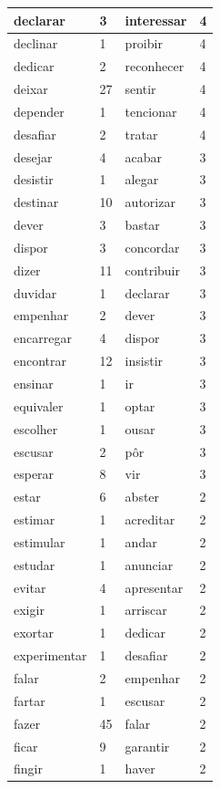 \documentclass[output=paper,colorlinks,citecolor=brown]{langscibook}
\begin{document}
\begin{longtable}{ p{3cm} | p{1cm} | p{3cm} | p{1cm} }
			declarar & 3 & interessar & 4\\\hline
			declinar & 1 & proibir & 4\\\hline
			dedicar & 2 & reconhecer & 4\\\hline
			deixar & 27 & sentir & 4\\\hline
			depender & 1 & tencionar & 4\\\hline
			desafiar & 2 & tratar & 4\\\hline
			desejar & 4 & acabar & 3\\\hline
			desistir & 1 & alegar & 3\\\hline
			destinar & 10 & autorizar & 3\\\hline
			dever & 3 & bastar & 3\\\hline
			dispor & 3 & concordar & 3\\\hline
			dizer & 11 & contribuir & 3\\\hline
			duvidar & 1 & declarar & 3\\\hline
			empenhar & 2 & dever & 3\\\hline
			encarregar & 4 & dispor & 3\\\hline
			encontrar & 12 & insistir & 3\\\hline
			ensinar & 1 & ir & 3\\\hline
			equivaler & 1 & optar & 3\\\hline
			escolher & 1 & ousar & 3\\\hline
			escusar & 2 & pôr & 3\\\hline
			esperar & 8 & vir & 3\\\hline
			estar & 6 & abster & 2\\\hline
			estimar & 1 & acreditar & 2\\\hline
			estimular & 1 & andar & 2\\\hline
			estudar & 1 & anunciar & 2\\\hline
			evitar & 4 & apresentar & 2\\\hline
			exigir & 1 & arriscar & 2\\\hline
			exortar & 1 & dedicar & 2\\\hline
			experimentar & 1 & desafiar & 2\\\hline
			falar & 2 & empenhar & 2\\\hline
			fartar & 1 & escusar & 2\\\hline
			fazer & 45 & falar & 2\\\hline
			ficar & 9 & garantir & 2\\\hline
			fingir & 1 & haver & 2\\\hline

\end{longtable}
\end{document}
